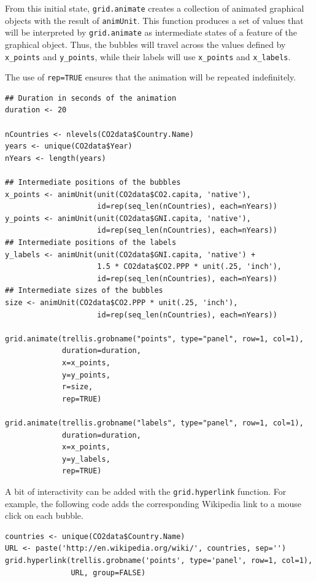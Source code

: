 \documentclass[smallroyalvopaper]{memoir}
\begin{document}
From this initial state, \texttt{grid.animate} creates a collection of
animated graphical objects with the result of \texttt{animUnit}. This
function produces a set of values that will be interpreted by
\texttt{grid.animate} as intermediate states of a feature of the graphical
object. Thus, the bubbles will travel across the values defined by
\texttt{x\_points} and \texttt{y\_points}, while their labels will use \texttt{x\_points} and
\texttt{x\_labels}.

The use of \texttt{rep=TRUE} ensures that the animation will be repeated
indefinitely.


\lstset{language=R,numbers=none}
\begin{lstlisting}
## Duration in seconds of the animation
duration <- 20

nCountries <- nlevels(CO2data$Country.Name)
years <- unique(CO2data$Year)
nYears <- length(years)

## Intermediate positions of the bubbles
x_points <- animUnit(unit(CO2data$CO2.capita, 'native'),
                     id=rep(seq_len(nCountries), each=nYears))
y_points <- animUnit(unit(CO2data$GNI.capita, 'native'),
                     id=rep(seq_len(nCountries), each=nYears))
## Intermediate positions of the labels
y_labels <- animUnit(unit(CO2data$GNI.capita, 'native') +
                     1.5 * CO2data$CO2.PPP * unit(.25, 'inch'),
                     id=rep(seq_len(nCountries), each=nYears))
## Intermediate sizes of the bubbles
size <- animUnit(CO2data$CO2.PPP * unit(.25, 'inch'),
                     id=rep(seq_len(nCountries), each=nYears))

grid.animate(trellis.grobname("points", type="panel", row=1, col=1),
             duration=duration,
             x=x_points,
             y=y_points,
             r=size,
             rep=TRUE)

grid.animate(trellis.grobname("labels", type="panel", row=1, col=1),
             duration=duration,
             x=x_points,
             y=y_labels,
             rep=TRUE)
\end{lstlisting}

A bit of interactivity can be added with the \texttt{grid.hyperlink}
function. For example, the following code adds the corresponding
Wikipedia link to a mouse click on each bubble.


\lstset{language=R,numbers=none}
\begin{lstlisting}
countries <- unique(CO2data$Country.Name)
URL <- paste('http://en.wikipedia.org/wiki/', countries, sep='')
grid.hyperlink(trellis.grobname('points', type='panel', row=1, col=1),
               URL, group=FALSE)
\end{lstlisting}
\end{document}

